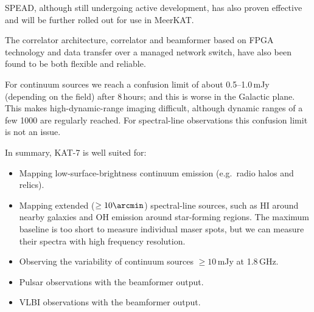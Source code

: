 SPEAD, although still undergoing active development, has also proven
effective and will be further rolled out for use in MeerKAT.

The correlator architecture, correlator and beamformer based on FPGA
technology and data transfer over a managed network switch, have also
been found to be both flexible and reliable.

For continuum sources we reach a confusion limit of about
0.5--1.0\,mJy (depending on the field) after 8\,hours; and this is
worse in the Galactic plane.  This makes high-dynamic-range imaging
difficult, although dynamic ranges of a few 1000 are regularly
reached. For spectral-line observations this confusion limit is not an
issue.

In summary, KAT-7 is well suited for:

\begin{itemize}
\item Mapping low-surface-brightness continuum emission (e.g.~radio
  halos and relics).
\item Mapping extended ($\geq 10\arcmin$) spectral-line sources, such
  as HI around nearby galaxies and OH emission around star-forming
  regions. The maximum baseline is too short to measure individual
  maser spots, but we can measure their spectra with high frequency
  resolution.
\item Observing the variability of continuum sources $\geq 10$\,mJy at
  1.8\,GHz.
\item Pulsar observations with the beamformer output.
\item VLBI observations with the beamformer output.
\end{itemize}

